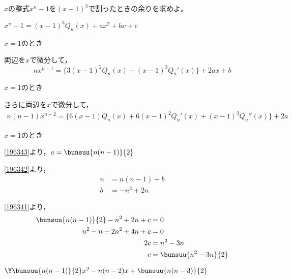 \begin{problem}
    $x$の整式$x^n-1$を${(x-1)}^3$で割ったときの余りを求めよ。
\end{problem}

$x^n - 1 = (x-1)^3 Q_n(x) + ax^2 + bx + c$

$x=1$のとき\qquad {}

両辺を$x$で微分して，
\[nx^{n-1} = \{3(x-1)^2Q_n(x) + (x-1)^3Q_n'(x)\} + 2ax + b\]

$x=1$のとき\qquad {}

さらに両辺を$x$で微分して，
\begin{align*}
    n(n-1)x^{n-2} =
    \{6(x-1)Q_n(x) + 6(x-1)^2Q_n'(x) +(x-1)^3Q_n''(x) \}+ 2a
\end{align*}

$x=1$のとき\qquad {}

\eqref{196343}より，$a = \bunsuu{n(n-1)}{2}$

\eqref{196342}より，\begin{align*}
    n &= n(n-1) + b\\
    b &= -n^2 + 2n
\end{align*}

\eqref{196341}より，\begin{align*}
    \bunsuu{n(n-1)}{2} - n^2 + 2n + c &= 0\\
    n^2 - n -2n^2 + 4n + c &= 0 \\
    2c &= n^2 - 3n\\
    c &= \bunsuu{n^2 - 3n}{2}
\end{align*}

\hfill
$\Y \bunsuu{n(n-1)}{2}x^2 - n(n-2)x + \bunsuu{n(n-3)}{2}$

